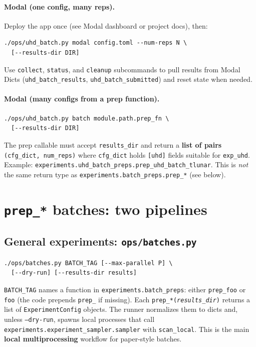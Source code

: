 \documentclass[11pt]{article}
\begin{document}
\paragraph{Modal (one config, many reps).}
Deploy the app once (see Modal dashboard or project docs), then:
\begin{verbatim}
./ops/uhd_batch.py modal config.toml --num-reps N \
  [--results-dir DIR]
\end{verbatim}
Use \texttt{collect}, \texttt{status}, and \texttt{cleanup} subcommands to pull results from Modal Dicts (\texttt{uhd\_batch\_results}, \texttt{uhd\_batch\_submitted}) and reset state when needed.

\paragraph{Modal (many configs from a prep function).}
\begin{verbatim}
./ops/uhd_batch.py batch module.path.prep_fn \
  [--results-dir DIR]
\end{verbatim}
The prep callable must accept \texttt{results\_dir} and return a \textbf{list of pairs} \texttt{(cfg\_dict, num\_reps)} where \texttt{cfg\_dict} holds \texttt{[uhd]} fields suitable for \texttt{exp\_uhd}. Example: \texttt{experiments.uhd\_batch\_preps.prep\_uhd\_batch\_tlunar}. This is \emph{not} the same return type as \texttt{experiments.batch\_preps.prep\_*} (see below).

\section{\texttt{prep\_*} batches: two pipelines}
\subsection{General experiments: \texttt{ops/batches.py}}
\begin{verbatim}
./ops/batches.py BATCH_TAG [--max-parallel P] \
  [--dry-run] [--results-dir results]
\end{verbatim}
\texttt{BATCH\_TAG} names a function in \texttt{experiments.batch\_preps}: either \texttt{prep\_foo} or \texttt{foo} (the code prepends \texttt{prep\_} if missing). Each \texttt{prep\_*(\textit{results\_dir})} returns a list of \texttt{ExperimentConfig} objects. The runner normalizes them to dicts and, unless \texttt{--dry-run}, spawns local processes that call \texttt{experiments.experiment\_sampler.sampler} with \texttt{scan\_local}. This is the main \textbf{local multiprocessing} workflow for paper-style batches.
\end{document}
